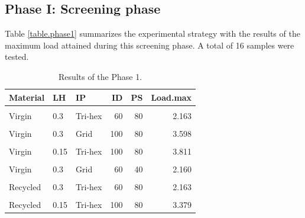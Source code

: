 \documentclass[conference,final,]{IEEEtran}
\begin{document}
\hypertarget{phase-i-screening-phase}{%
\subsection{Phase I: Screening phase}\label{phase-i-screening-phase}}

Table \ref{table.phase1} summarizes the experimental strategy with the
results of the maximum load attained during this screening phase. A
total of 16 samples were tested.

\begin{table}

\caption{\label{tab:table.S2}Results of the Phase 1. \label{tab:anova.phase1}}
\centering
\begin{threeparttable}
\begin{tabular}[t]{lllrrr}
\toprule
Material & LH & IP & ID & PS & Load.max\\
\midrule
\cellcolor{gray!6}{Virgin} & \cellcolor{gray!6}{0.15} & \cellcolor{gray!6}{Tri-hex} & \cellcolor{gray!6}{60} & \cellcolor{gray!6}{40} & \cellcolor{gray!6}{2.206}\\
Virgin & 0.3 & Tri-hex & 60 & 80 & 2.163\\
\cellcolor{gray!6}{Virgin} & \cellcolor{gray!6}{0.15} & \cellcolor{gray!6}{Grid} & \cellcolor{gray!6}{60} & \cellcolor{gray!6}{80} & \cellcolor{gray!6}{2.240}\\
Virgin & 0.3 & Grid & 100 & 80 & 3.598\\
\cellcolor{gray!6}{Virgin} & \cellcolor{gray!6}{0.3} & \cellcolor{gray!6}{Tri-hex} & \cellcolor{gray!6}{100} & \cellcolor{gray!6}{40} & \cellcolor{gray!6}{3.620}\\
Virgin & 0.15 & Tri-hex & 100 & 80 & 3.811\\
\cellcolor{gray!6}{Virgin} & \cellcolor{gray!6}{0.15} & \cellcolor{gray!6}{Grid} & \cellcolor{gray!6}{100} & \cellcolor{gray!6}{40} & \cellcolor{gray!6}{3.793}\\
Virgin & 0.3 & Grid & 60 & 40 & 2.160\\
\cellcolor{gray!6}{Recycled} & \cellcolor{gray!6}{0.15} & \cellcolor{gray!6}{Tri-hex} & \cellcolor{gray!6}{60} & \cellcolor{gray!6}{40} & \cellcolor{gray!6}{2.163}\\
Recycled & 0.3 & Tri-hex & 60 & 80 & 2.163\\
\cellcolor{gray!6}{Recycled} & \cellcolor{gray!6}{0.3} & \cellcolor{gray!6}{Grid} & \cellcolor{gray!6}{60} & \cellcolor{gray!6}{40} & \cellcolor{gray!6}{2.152}\\
Recycled & 0.15 & Tri-hex & 100 & 80 & 3.379\\

\end{tabular}
\end{threeparttable}
\end{table}
\end{document}
